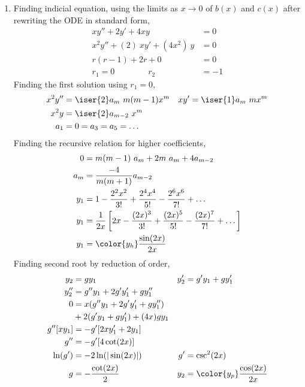 \begin{enumerate}
    \item Finding indicial equation, using the limits as $ x \to 0 $
          of $ b(x) $ and $ c(x) $ after rewriting the ODE in standard form,
          \begin{align}
              xy'' + 2y' + 4xy              & = 0  \\
              x^2y'' + (2)\ xy' + (4x^2)\ y & = 0  \\
              r(r-1) + 2r + 0               & = 0  \\
              r_1 = 0 \qquad\qquad r_2      & = -1
          \end{align}
          Finding the first solution using $ r_1 = 0 $,
          \begin{align}
              x^2y'' & = \iser{2}a_m\ m(m-1)x^m &
              xy'    & = \iser{1}a_m\ m x^m       \\
              x^2y   & = \iser{2}a_{m-2}\ x^{m}   \\
              a_1    & = 0 = a_3 = a_5 = \dots
          \end{align}
          Finding the recursive relation for higher coefficients,
          \begin{align}
              0   & = m(m-1)\ a_m + 2m\ a_m + 4a_{m-2}                \\
              a_m & = \frac{-4}{m(m+1)}a_{m-2}                        \\
              y_1 & =  1 - \frac{2^2x^2}{3!} + \frac{2^4 x^4}{5!}
              - \frac{2^6 x^6}{7!} + \dots                            \\
              y_1 & = \frac{1}{2x}\left[ 2x - \frac{(2x)^3}{3!}
              + \frac{(2x)^5}{5!} - \frac{(2x)^7}{7!} + \dots \right] \\
              y_1 & = \color{y_h} \frac{\sin(2x)}{2x}
          \end{align}
          Finding second root by reduction of order,
          \begin{align}
              y_2       & = gy_1                            &
              y_2'      & = g'y_1 + gy_1'                     \\
              y_2''     & = g''y_1 + 2g'y_1' + gy_1''         \\
              0         & = x(g''y_1 + 2g'y_1' + gy_1'')      \\
                        & + 2(g'y_1 + gy_1') + (4x)gy_1       \\
              g''[xy_1] & = -g' [2xy_1' + 2y_1]               \\
              g''       & = -g' [4\cot(2x)]                   \\
              \ln(g')   & = -2\ln(|\sin(2x)|)               &
              g'        & = \csc^{2}(2x)                      \\
              g         & = -\frac{\cot(2x)}{2}             &
              y_2       & = \color{y_p} \frac{\cos(2x)}{2x}
          \end{align}


\end{enumerate}
